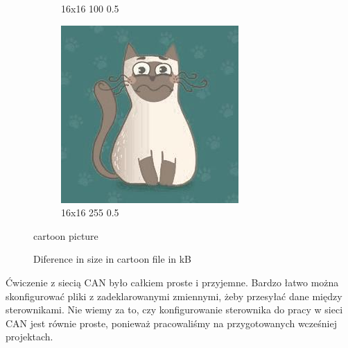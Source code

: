\documentclass[12pt,a4paper]{article}
\begin{document}
\begin{figure}[htb]
\begin{subfigure}{0.25\textwidth}
  \caption{16x16 100 0.5}
  \label{fig:6}
\end{subfigure}
\begin{subfigure}{0.25\textwidth}
  \includegraphics[width=\linewidth]{images/cartoon/16-16-255-05}
  \caption{16x16 255 0.5}
  \label{fig:5}
\end{subfigure}\hfil %


\caption{cartoon picture}
\label{fig:images}
\end{figure}

\begin{figure}
    \begin{bchart}[max=200]
            \smallskip
            \smallskip
            \smallskip
            \smallskip
            \smallskip
            \smallskip
            \smallskip
            \smallskip
            \smallskip
            \smallskip
            \smallskip
            \smallskip
    \end{bchart} 
            \caption{Diference in size in cartoon file in kB}
    \end{figure}

Ćwiczenie z siecią CAN było całkiem proste i przyjemne. Bardzo łatwo można skonfigurować pliki z zadeklarowanymi zmiennymi, żeby przesyłać dane między sterownikami. Nie wiemy za to, czy konfigurowanie sterownika do pracy w sieci CAN jest równie proste, ponieważ pracowaliśmy na przygotowanych wcześniej projektach.
\end{document}
